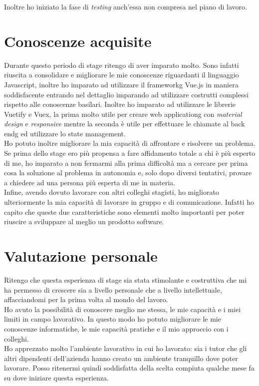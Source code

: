 Inoltre ho iniziato la fase di \textit{testing} anch'essa non compresa nel piano di lavoro.

\section{Conoscenze acquisite}
\label{sec:conoscenze-acquisite}

Durante questo periodo di stage ritengo di aver imparato molto. Sono infatti riuscita a consolidare e migliorare le mie conoscenze riguardanti il linguaggio Javascript, inoltre ho imparato ad utilizzare il \gls{frameworkg} Vue.js in maniera soddisfacente entrando nel dettaglio imparando ad utilizzare costrutti complessi rispetto alle conoscenze basilari. Inoltre ho imparato ad utilizzare le librerie Vuetify e Vuex, la prima molto utile per creare \gls{web applicationg} con \textit{material design} e \textit{responsive} mentre la seconda è utile per effettuare le chiamate al \gls{back endg} ed utilizzare lo state management.\\
Ho potuto inoltre migliorare la mia capacità di affrontare e risolvere un problema. Se prima dello stage ero più propensa a fare affidamento totale a chi è più esperto di me, ho imparato a non fermarmi alla prima difficoltà ma a cercare per prima cosa la soluzione al problema in autonomia e, solo dopo diversi tentativi, provare a chiedere ad una persona più esperta di me in materia.\\
Infine, avendo dovuto lavorare con altri colleghi stagisti, ho migliorato ulteriormente la mia capacità di lavorare in gruppo e di comunicazione. Infatti ho capito che queste due caratteristiche sono elementi molto importanti per poter riuscire a sviluppare al meglio un prodotto software.

\section{Valutazione personale}
\label{sec:valutazione-personale}

Ritengo che questa esperienza di stage sia stata stimolante e costruttiva che mi ha permesso di crescere sia a livello personale che a livello intellettuale, affacciandomi per la prima volta al mondo del lavoro.\\
Ho avuto la possibilità di conoscere meglio me stessa, le mie capacità e i miei limiti in campo lavorativo. In questo modo ho potuto migliorare le mie conoscenze informatiche, le mie capacità pratiche e il mio approccio con i colleghi.\\
Ho apprezzato molto l'ambiente lavorativo in cui ho lavorato: sia i tutor che gli altri dipendenti dell'azienda hanno creato un ambiente tranquillo dove poter lavorare. Posso ritenermi quindi soddisfatta della scelta compiuta qualche mese fa su dove iniziare questa esperienza. 
